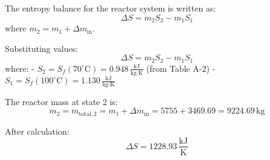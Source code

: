The entropy balance for the reactor system is written as:  
\[
\Delta S = m_2 S_2 - m_1 S_1
\]  
where \( m_2 = m_1 + \Delta m_{\text{in}} \).  

Substituting values:  
\[
\Delta S = m_2 S_2 - m_1 S_1
\]  
where:  
- \( S_2 = S_f(70^\circ\text{C}) = 0.948 \, \frac{\text{kJ}}{\text{kg·K}} \) (from Table A-2)  
- \( S_1 = S_f(100^\circ\text{C}) = 1.130 \, \frac{\text{kJ}}{\text{kg·K}} \)  

The reactor mass at state 2 is:  
\[
m_2 = m_{\text{total},2} = m_1 + \Delta m_{\text{in}} = 5755 + 3469.69 = 9224.69 \, \text{kg}
\]  

After calculation:  
\[
\Delta S = 1228.93 \, \frac{\text{kJ}}{\text{K}}
\]